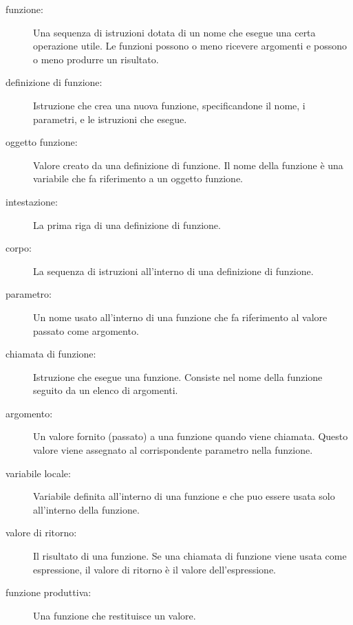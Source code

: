 \documentclass[10pt]{book}
\begin{document}
\begin{description}

\item[funzione:] Una sequenza di istruzioni dotata di un nome che esegue una certa operazione utile. Le funzioni possono o meno ricevere argomenti e possono o meno produrre un risultato.

\item[definizione di funzione:]  Istruzione che crea una nuova funzione, specificandone il nome, i parametri, e le istruzioni che esegue.

\item[oggetto funzione:]  Valore creato da una definizione di funzione. Il nome della funzione è una variabile che fa riferimento a un oggetto funzione.

\item[intestazione:] La prima riga di una definizione di funzione.

\item[corpo:] La sequenza di istruzioni all'interno di una definizione di funzione.

\item[parametro:] Un nome usato all'interno di una funzione che fa riferimento al valore passato come argomento.

\item[chiamata di funzione:] Istruzione che esegue una funzione. Consiste nel nome della funzione seguito da un elenco di argomenti.

\item[argomento:]  Un valore fornito (passato) a una funzione quando viene chiamata. Questo valore viene assegnato al corrispondente parametro nella funzione.

\item[variabile locale:]  Variabile definita all'interno di una funzione e che puo essere usata solo all'interno della funzione.

\item[valore di ritorno:]  Il risultato di una funzione. Se una chiamata di funzione viene usata come espressione, il valore di ritorno è il valore dell'espressione.

\item[funzione produttiva:] Una funzione che restituisce un valore.


\end{description}
\end{document}
